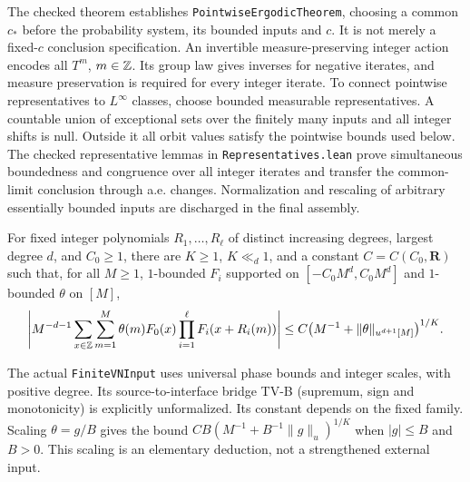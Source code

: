 The checked theorem establishes \texttt{PointwiseErgodicTheorem}, choosing a common $c_*$ before the probability system, its bounded inputs and $c$. It is not merely a fixed-$c$ conclusion specification. An invertible measure-preserving integer action encodes all $T^m$, $m\in\mathbb Z$. Its group law gives inverses for negative iterates, and measure preservation is required for every integer iterate. To connect pointwise representatives to $L^\infty$ classes, choose bounded measurable representatives. A countable union of exceptional sets over the finitely many inputs and all integer shifts is null. Outside it all orbit values satisfy the pointwise bounds used below. The checked representative lemmas in \texttt{Representatives.lean} prove simultaneous boundedness and congruence over all integer iterates and transfer the common-limit conclusion through a.e. changes. Normalization and rescaling of arbitrary essentially bounded inputs are discharged in the final assembly.
\fi

\begin{theorem}\label{t:teravainen}
For fixed integer polynomials $R_1,\ldots,R_\ell$ of distinct increasing degrees, largest degree $d$, and $C_0\geq1$, there are $K\geq1$, $K\ll_d1$, and a constant $C=C(C_0,\mathbf R)$ such that, for all $M\geq1$, $1$-bounded $F_i$ supported on $[-C_0M^d,C_0M^d]$ and $1$-bounded $\theta$ on $[M]$,
\[
 \left|M^{-d-1}\sum_{x\in\mathbb Z}\sum_{m=1}^M
 \theta(m)F_0(x)\prod_{i=1}^{\ell}F_i(x+R_i(m))\right|
 \leq C\bigl(M^{-1}+\|\theta\|_{u^{d+1}[M]}\bigr)^{1/K}.
\]
\end{theorem}
The actual \texttt{FiniteVNInput} uses universal phase bounds and integer scales, with positive degree. Its source-to-interface bridge TV-B (supremum, sign and monotonicity) is explicitly unformalized. Its constant depends on the fixed family. Scaling $\theta=g/B$ gives the bound $CB(M^{-1}+B^{-1}\|g\|_u)^{1/K}$ when $|g|\leq B$ and $B>0$. This scaling is an elementary deduction, not a strengthened external input.

